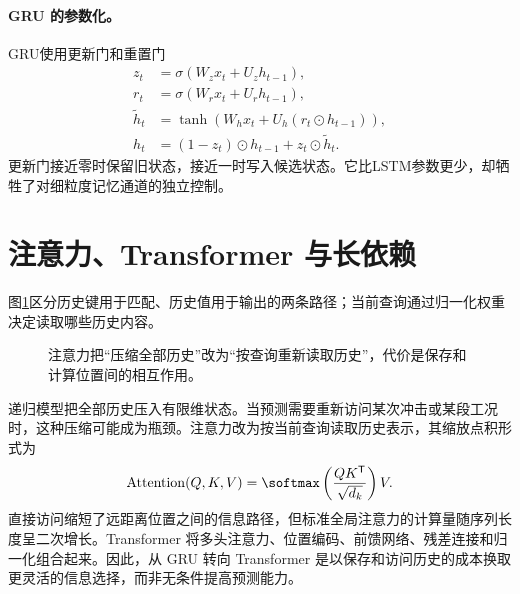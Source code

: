 \paragraph{GRU 的参数化。}
GRU使用更新门和重置门
\begin{align}
 z_t&=\sigma(W_zx_t+U_zh_{t-1}),\\
 r_t&=\sigma(W_rx_t+U_rh_{t-1}),\\
 \tilde h_t&=\tanh(W_hx_t+U_h(r_t\odot h_{t-1})),\\
 h_t&=(1-z_t)\odot h_{t-1}+z_t\odot\tilde h_t.
\end{align}
更新门接近零时保留旧状态，接近一时写入候选状态。它比LSTM参数更少，却牺牲了对细粒度记忆通道的独立控制。

\section{注意力、Transformer 与长依赖}
图\ref{fig:sequence-attention-query}区分历史键用于匹配、历史值用于输出的两条路径；当前查询通过归一化权重决定读取哪些历史内容。
\begin{figure}[htbp]
\centering
{}
\caption{注意力把“压缩全部历史”改为“按查询重新读取历史”，代价是保存和计算位置间的相互作用。}
\label{fig:sequence-attention-query}
\end{figure}
递归模型把全部历史压入有限维状态。当预测需要重新访问某次冲击或某段工况时，这种压缩可能成为瓶颈。注意力改为按当前查询读取历史表示，其缩放点积形式为\cite{vaswani2017attention}
\begin{equation}
 \operatorname{Attention}(Q,K,V)=\softmax\left(\frac{QK^{\mathsf T}}{\sqrt{d_k}}\right)V.
\end{equation}
直接访问缩短了远距离位置之间的信息路径，但标准全局注意力的计算量随序列长度呈二次增长。Transformer 将多头注意力、位置编码、前馈网络、残差连接和归一化组合起来。因此，从 GRU 转向 Transformer 是以保存和访问历史的成本换取更灵活的信息选择，而非无条件提高预测能力。


